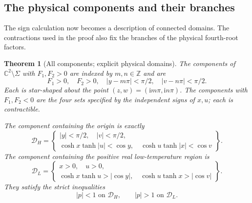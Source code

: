 \documentclass[11pt]{article}
\numberwithin{equation}{section}
\newtheorem{theorem}{Theorem}[section]
\theoremstyle{definition}
\newcommand{\C}{\mathbb C}
\newcommand{\Z}{\mathbb Z}
\newcommand{\ii}{\mathrm i}
\renewcommand{\DH}{\mathcal D_H}
\newcommand{\DL}{\mathcal D_L}
\begin{document}
\subsection{The physical components and their branches}
\label{geo:components-section}

The sign calculation now becomes a description of connected domains.
The contractions used in the proof also fix the branches of the
physical fourth-root factors.

\begin{theorem}[All components; explicit physical domains]
\label{geo:components}
The components of \(\C^2\setminus\Sigma\) with \(F_1,F_2>0\)
are indexed by \(m,n\in\Z\) and are
\[
 F_1>0,\quad F_2>0,\quad
 |y-m\pi|<\pi/2,\quad |v-n\pi|<\pi/2.
\]
Each is star-shaped about the point
\((z,w)=(\ii m\pi,\ii n\pi)\).
The components with \(F_1,F_2<0\) are the four sets specified
by the independent signs of \(x,u\); each is contractible.

The component containing the origin is exactly
\begin{equation}\label{geo:DH}
 \DH=\left\{
 \begin{array}{l}
 |y|<\pi/2,\quad |v|<\pi/2,\\
 \cosh x\tanh|u|<\cos y,\quad
 \cosh u\tanh|x|<\cos v
 \end{array}\right\}.
\end{equation}
The component containing the positive real low-temperature region is
\begin{equation}\label{geo:DL}
 \DL=\left\{
 \begin{array}{l}
 x>0,\quad u>0,\\
 \cosh x\tanh u>|\cos y|,\quad
 \cosh u\tanh x>|\cos v|
 \end{array}\right\}.
\end{equation}
They satisfy the strict inequalities
\begin{equation}\label{geo:p-domains}
                         |p|<1\text{ on }\DH,\qquad
                         |p|>1\text{ on }\DL.
\end{equation}
\end{theorem}
\end{document}
